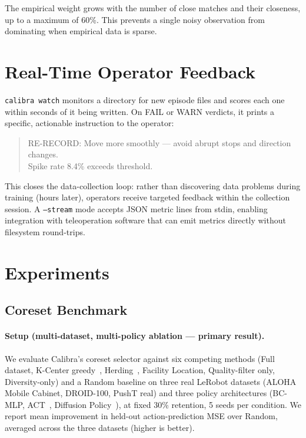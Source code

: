 \documentclass[10pt,twocolumn]{article}
\begin{document}
The empirical weight grows with the number of close matches and their
closeness, up to a maximum of 60\%. This prevents a single noisy observation
from dominating when empirical data is sparse.

\section{Real-Time Operator Feedback}
\label{sec:watch}

\texttt{calibra watch} monitors a directory for new episode files and scores
each one within seconds of it being written. On FAIL or WARN verdicts, it
prints a specific, actionable instruction to the operator:

\begin{quote}
\small\ttfamily
RE-RECORD: Move more smoothly --- avoid abrupt stops and direction changes.\\
Spike rate 8.4\% exceeds threshold.
\end{quote}

This closes the data-collection loop: rather than discovering data problems
during training (hours later), operators receive targeted feedback within the
collection session. A \texttt{--stream} mode accepts JSON metric lines from
stdin, enabling integration with teleoperation software that can emit metrics
directly without filesystem round-trips.

\section{Experiments}
\label{sec:experiments}

\subsection{Coreset Benchmark}
\label{sec:coreset_exp}

\paragraph{Setup (multi-dataset, multi-policy ablation --- primary result).}
We evaluate Calibra's coreset selector against six competing methods
(Full dataset, K-Center greedy~\citep{gonzalez1985}, Herding~\citep{rebuffi2017},
Facility Location, Quality-filter only, Diversity-only) and a Random baseline
on three real LeRobot datasets (ALOHA Mobile Cabinet, DROID-100, PushT real)
and three policy architectures (BC-MLP, ACT~\citep{zhao2023act}, Diffusion
Policy~\citep{chi2023diffusion}), at fixed 30\% retention, 5 seeds per
condition. We report mean improvement in held-out action-prediction MSE over
Random, averaged across the three datasets (higher is better).
\end{document}
